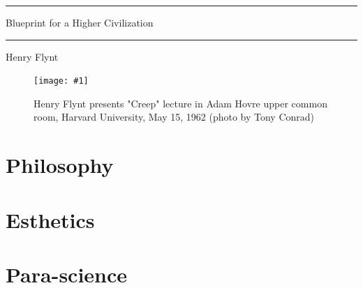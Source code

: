 \documentclass[10pt,twoside,draft]{memoir}
\begin{document}
\frontmatter
\graphicspath{{img/}}
\pagestyle{ruled}
\openany

\renewcommand*{\cftpartfont}{\bfseries\scshape}
\renewcommand*{\cftchapterfont}{\normalfont}
\renewcommand*{\cftsectionfont}{\itshape}

\thispagestyle{empty}
{
	\centering\sffamily

	\plainbreak{3}

	{ \Large
	Blueprint for a Higher Civilization \par}

	\plainbreak{3}

	{ \large Henry Flynt \par}
}

\clearpage

\newcommand{\photopage}[3]{
	\begin{figure}[!hp]
		\centering
		\texttt{[image: \#1]}
		\caption{#2 (photo by #3)}
	\end{figure}}

\photopage{img/creep}{Henry Flynt presents "Creep" lecture in Adam Hovre upper common room, Harvard University, May 15, 1962}{Tony Conrad}




\tableofcontents*

\clearpage

\mainmatter
\part{Philosophy}







\part{Esthetics}








\part{Para-science}




\end{document}
